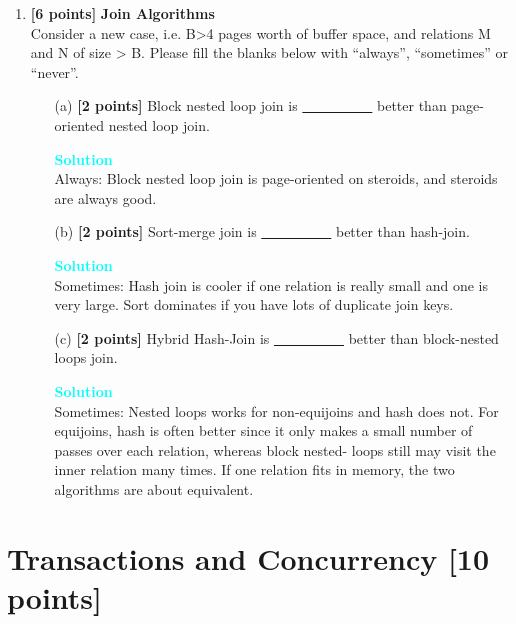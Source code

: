 \documentclass[10pt]{article}
\newenvironment{solution}
    { \begin{mdframed}[backgroundcolor=gray!10] \textcolor{cyan}{\textbf{Solution}} \\}
    {  \end{mdframed}}
\begin{document}
\begin{enumerate}
	\item \textbf{[6 points]} \textbf{Join Algorithms} \\
	      Consider a new case, i.e. B>4 pages worth of buffer space, and relations M and N of size > B.
	      Please fill the blanks below with ``always'', ``sometimes'' or ``never''.
	      \begin{itemize}
		      \item[(a)] \textbf{[2 points]} Block nested loop join is \underline{\ \ \ \ \ \ \ \ \ \ } better than page-oriented nested loop join.
		            \begin{solution}
			            Always: Block nested loop join is page-oriented on steroids, and steroids are always good.
		            \end{solution}
		      \item[(b)] \textbf{[2 points]} Sort-merge join is \underline{\ \ \ \ \ \ \ \ \ \ } better than hash-join.
		            \begin{solution}
			            Sometimes: Hash join is cooler if one relation is really small and one is very large. Sort dominates if you have lots of duplicate join keys.
		            \end{solution}
		      \item[(c)] \textbf{[2 points]} Hybrid Hash-Join is \underline{\ \ \ \ \ \ \ \ \ \ } better than block-nested loops join.
		            \begin{solution}
			            Sometimes: Nested loops works for non-equijoins and hash does not.
			            For equijoins, hash is often better since it only makes a small number of passes over each relation, whereas block nested- loops still may visit the inner relation many times. If one relation fits in memory, the two algorithms are about equivalent.
		            \end{solution}
	      \end{itemize}
\end{enumerate}



\newpage
\section{Transactions and Concurrency \textbf{[10 points]}}
\end{document}
